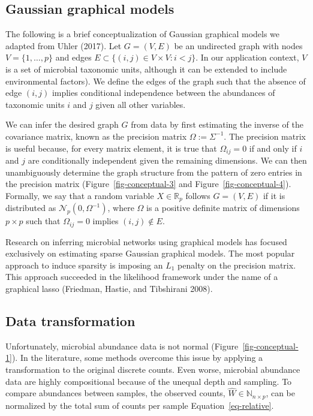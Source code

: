 \documentclass[
  a4paper,
]{article}
\begin{document}
\hypertarget{gaussian-graphical-models}{%
\subsection{Gaussian graphical models}\label{gaussian-graphical-models}}

The following is a brief conceptualization of Gaussian graphical models
we adapted from Uhler (2017). Let \(G = (V, E)\) be an undirected graph
with nodes \(V=\{1, \dots, p\}\) and edges
\(E \subset \{(i, j) \in V\times V : i<j\}\). In our application
context, \(V\) is a set of microbial taxonomic units, although it can be
extended to include environmental factors). We define the edges of the
graph such that the absence of edge \((i, j)\) implies conditional
independence between the abundances of taxonomic units \(i\) and \(j\)
given all other variables.

We can infer the desired graph \(G\) from data by first estimating the
inverse of the covariance matrix, known as the precision matrix
\(\Omega:= \Sigma^{-1}\). The precision matrix is useful because, for
every matrix element, it is true that \(\Omega_{ij}=0\) if and only if
\(i\) and \(j\) are conditionally independent given the remaining
dimensions. We can then unambiguously determine the graph structure from
the pattern of zero entries in the precision matrix
(Figure~\ref{fig-conceptual-3} and Figure~\ref{fig-conceptual-4}).
Formally, we say that a random variable \(X \in \mathbb R_p\) follows
\(G = (V, E)\) if it is distributed as
\(\mathcal N_p(0, \Omega ^{-1})\), where \(\Omega\) is a positive
definite matrix of dimensions \(p\times p\) such that
\(\Omega_{ij} = 0\) implies \((i, j) \notin E\).

Research on inferring microbial networks using graphical models has
focused exclusively on estimating sparse Gaussian graphical models. The
most popular approach to induce sparsity is imposing an \(L_1\) penalty
on the precision matrix. This approach succeeded in the likelihood
framework under the name of a graphical lasso (Friedman, Hastie, and
Tibshirani 2008).

\hypertarget{data-transformation}{%
\subsection{Data transformation}\label{data-transformation}}

Unfortunately, microbial abundance data is not normal
(Figure~\ref{fig-conceptual-1}). In the literature, some methods
overcome this issue by applying a transformation to the original
discrete counts. Even worse, microbial abundance data are highly
compositional because of the unequal depth and sampling. To compare
abundances between samples, the observed counts,
\(\hat W\in \mathbb N_{n \times p}\), can be normalized by the total sum
of counts per sample Equation~\ref{eq-relative}.
\end{document}
